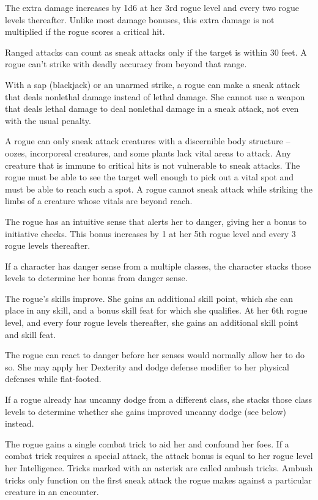 The extra damage increases by 1d6 at her 3rd rogue level and every two rogue levels thereafter. Unlike most damage bonuses, this extra damage is not multiplied if the rogue scores a critical hit.

\par Ranged attacks can count as sneak attacks only if the target is within 30 feet. A rogue can't strike with deadly accuracy from beyond that range.

With a sap (blackjack) or an unarmed strike, a rogue can make a sneak attack that deals nonlethal damage instead of lethal damage. She cannot use a weapon that deals lethal damage to deal nonlethal damage in a sneak attack, not even with the usual  penalty.

A rogue can only sneak attack creatures with a discernible body structure -- oozes, incorporeal creatures, and some plants lack vital areas to attack. Any creature that is immune to critical hits is not vulnerable to sneak attacks. The rogue must be able to see the target well enough to pick out a vital spot and must be able to reach such a spot. A rogue cannot sneak attack while striking the limbs of a creature whose vitals are beyond reach.

 The rogue has an intuitive sense that alerts her to danger, giving her a  bonus to initiative checks. This bonus increases by 1 at her 5th rogue level and every 3 rogue levels thereafter.
\par If a character has danger sense from a multiple classes, the character stacks those levels to determine her bonus from danger sense.

 The rogue's skills improve. She gains an additional skill point, which she can place in any skill, and a bonus skill feat for which she qualifies. At her 6th rogue level, and every four rogue levels thereafter, she gains an additional skill point and skill feat.

 The rogue can react to danger before her senses would normally allow her to do so. She may apply her Dexterity and dodge defense modifier to her physical defenses while flat-footed.

If a rogue already has uncanny dodge from a different class, she stacks those class levels to determine whether she gains improved uncanny dodge (see below) instead.

 The rogue gains a single combat trick to aid her and confound her foes. If a combat trick requires a special attack, the attack bonus is equal to her rogue level \add her Intelligence. Tricks marked with an asterisk are called ambush tricks. Ambush tricks only function on the first sneak attack the rogue makes against a particular creature in an encounter.

